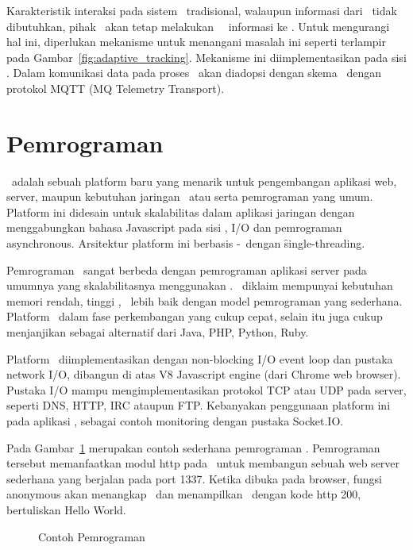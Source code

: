 Karakteristik interaksi pada sistem \pubsub~tradisional, walaupun informasi dari
\publisher~tidak dibutuhkan, pihak \publisher~akan tetap melakukan
\event~\publish~informasi ke \broker. Untuk mengurangi hal ini, diperlukan
mekanisme untuk menangani masalah ini seperti terlampir pada
Gambar~\ref{fig:adaptive_tracking}. Mekanisme ini diimplementasikan pada sisi
\server. Dalam komunikasi data pada proses \tracking~akan diadopsi dengan skema
\pubsub~dengan protokol MQTT (MQ Telemetry Transport).

\section{Pemrograman \nodejs}

\nodejs~adalah sebuah platform baru yang menarik untuk pengembangan aplikasi
web, server, maupun kebutuhan jaringan \server~atau \client serta pemrograman
yang umum. Platform ini didesain untuk skalabilitas dalam aplikasi jaringan
dengan menggabungkan bahasa Javascript pada sisi \server, \asynchronous I/O dan
pemrograman asynchronous. Arsitektur platform ini berbasis \event-\driven~dengan
\f{single-threading}.

Pemrograman \nodejs~sangat berbeda dengan pemrograman aplikasi server pada
umumnya yang skalabilitasnya menggunakan \thread. \nodejs~diklaim mempunyai
kebutuhan memori rendah, tinggi \throughput, \latency~lebih baik dengan model
pemrograman yang sederhana. Platform \nodejs~dalam fase perkembangan yang cukup
cepat, selain itu juga cukup menjanjikan sebagai alternatif dari Java, PHP,
Python, Ruby.

Platform \nodejs~diimplementasikan dengan non-blocking I/O event loop dan
pustaka network I/O, dibangun di atas V8 Javascript engine (dari Chrome web
browser). Pustaka I/O mampu mengimplementasikan protokol TCP atau UDP pada
server, seperti DNS, HTTP, IRC ataupun FTP\@. Kebanyakan penggunaan platform ini
pada aplikasi \realtime, sebagai contoh monitoring dengan pustaka Socket.IO.

Pada Gambar~\ref{fig:nodejs} merupakan contoh sederhana pemrograman \nodejs.
Pemrograman tersebut memanfaatkan modul http pada \nodejs~untuk membangun sebuah
web server sederhana yang berjalan pada port 1337. Ketika dibuka pada browser,
fungsi anonymous akan menangkap \request~dan menampilkan \response~dengan kode
http 200, bertuliskan Hello World.

\noindent
\begin{figure}
	\centering
	\lstset{basicstyle=\ttfamily,frame=single,language=javascript}
	
	\caption{Contoh Pemrograman \nodejs}
	\label{fig:nodejs}
\end{figure}

